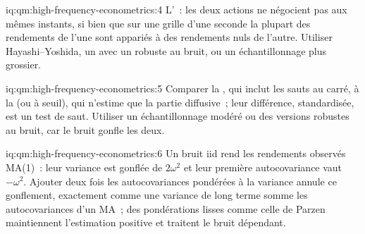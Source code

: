 \begin{solution}{iq:qm:high-frequency-econometrics:4}
L'~: les deux actions ne négocient pas aux mêmes instants, si bien que sur une grille d'une seconde la plupart des rendements de l'une sont appariés à des rendements nuls de l'autre. Utiliser Hayashi--Yoshida,
un  avec un  robuste au bruit, ou un échantillonnage plus grossier.
\end{solution}

\begin{solution}{iq:qm:high-frequency-econometrics:5}
Comparer la , qui inclut les sauts au carré, à la  (ou à seuil), qui n'estime que la partie diffusive~; leur différence, standardisée,
est un test de saut. Utiliser un échantillonnage modéré ou des versions robustes au bruit, car le bruit gonfle les deux.
\end{solution}

\begin{solution}{iq:qm:high-frequency-econometrics:6}
Un bruit iid rend les rendements observés MA(1)~: leur variance est gonflée de $2\omega^2$ et leur première autocovariance vaut $-\omega^2$. Ajouter deux fois les autocovariances pondérées à la variance
annule ce gonflement, exactement comme une variance de long terme somme les autocovariances d'un MA~; des pondérations lisses comme celle de Parzen maintiennent l'estimation positive et traitent le bruit dépendant.
\end{solution}
